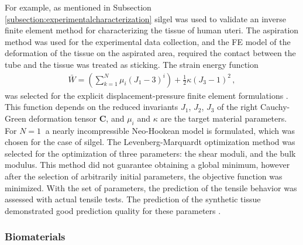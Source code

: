For example, as mentioned in Subsection \ref{subsection:experimentalcharacterization} silgel was used to validate an inverse
finite element method for characterizing the tissue of human uteri. The aspiration method was used for the experimental data collection, 
and the FE model of the deformation of the tissue on the aspirated area, required the contact 
between the tube and the tissue was treated as sticking. The strain energy function 
\begin{align}
        \bar{W} = (\sum_{k=1}^N \mu_i(J_1 - 3)^i) + \frac{1}{2}\kappa(J_3 - 1)^2 \,,
\end{align}
was selected for the explicit displacement-pressure finite element formulations \cite{Sussman1987}. 
This function depends on the reduced invariants $J_1$, $J_2$, $J_3$ of the right Cauchy-Green 
deformation tensor $\boldsymbol{C}$, and $\mu_i$ and $\kappa$ are the target material parameters. For $N = \SI{1}{}$ a nearly incompressible Neo-Hookean model 
is formulated, which was chosen for the case of silgel. The Levenberg-Marquardt optimization method was selected for the optimization 
of three parameters: the shear moduli, and the bulk modulus. This method did not guarantee obtaining a global minimum, however after the selection of arbitrarily 
initial parameters, the objective function was minimized. With the set of parameters, the prediction of the tensile behavior was assessed with 
actual tensile tests. The prediction of the synthetic tissue demonstrated good prediction quality for these parameters \cite{Kauer2002}.

\subsubsection*{Biomaterials}

